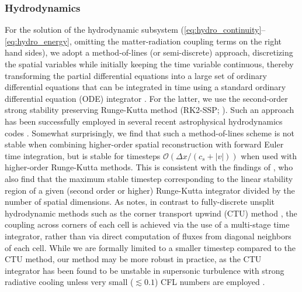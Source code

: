 \documentclass[fleqn,usenatbib]{mnras}
\begin{document}
\subsubsection{Hydrodynamics}
\label{sssec:hydro}
For the solution of the hydrodynamic subsystem (\autoref{eq:hydro_continuity}--\autoref{eq:hydro_energy}, omitting the matter-radiation coupling terms on the right hand sides), we adopt a method-of-lines (or semi-discrete) approach, discretizing the spatial variables while initially keeping the time variable continuous, thereby transforming the partial differential equations into a large set of ordinary differential equations that can be integrated in time using a standard ordinary differential equation (ODE) integrator \citep{Jameson_1981}. For the latter, we use the second-order strong stability preserving Runge-Kutta method (RK2-SSP; \citealt{Shu_1988}). Such an approach has been successfully employed in several recent astrophysical hydrodynamics codes \citep{Skinner_2019,Stone_2020}. Somewhat surprisingly, we find that such a method-of-lines scheme is not stable when combining higher-order spatial reconstruction with forward Euler time integration, but is stable for timesteps $\mathcal{O}(\Delta x / (c_s + |v|))$ when used with higher-order Runge-Kutta methods. This is consistent with the findings of \cite{Stone_2020}, who also find that the maximum stable timestep corresponding to the linear stability region of a given (second order or higher) Runge-Kutta integrator divided by the number of spatial dimensions. As \cite{Skinner_2019} notes, in contrast to fully-discrete unsplit hydrodynamic methods such as the corner transport upwind (CTU) method \citep{Colella_1990}, the coupling across corners of each cell is achieved via the use of a multi-stage time integrator, rather than via direct computation of fluxes from diagonal neighbors of each cell. While we are formally limited to a smaller timestep compared to the CTU method, our method may be more robust in practice, as the CTU integrator has been found to be unstable in supersonic turbulence with strong radiative cooling unless very small ($\lesssim 0.1$) CFL numbers are employed \citep{Schneider_2017}.
\end{document}
